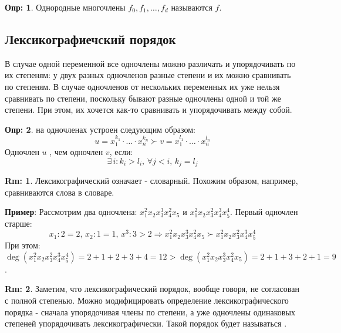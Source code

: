 \documentclass[12pt]{article}
\theoremstyle{definition}
\newtheorem{defn}{Опр:}
\newtheorem{rem}{Rm:}
\begin{document}
\begin{defn}
	Однородные многочлены $f_0,f_1,\dotsc, f_d$ называются  $f$.
\end{defn}

\subsection*{Лексикографиечский порядок}
В случае одной переменной все одночлены можно различать и упорядочивать по их степеням: у двух разных одночленов разные степени и их можно сравнивать по степеням. В случае одночленов от нескольких переменных их уже нельзя сравнивать по степени, поскольку бывают разные одночлены одной и той же степени. При этом, их хочется как-то сравнивать и упорядочивать между собой.

\begin{defn}
	 на одночленах устроен следующим образом:
	$$
		u = x_1^{k_1}{\cdot}\dotsc{\cdot}x_n^{k_n} \succ v = x_1^{l_1}{\cdot}\dotsc{\cdot}x_n^{l_n}
	$$
	Одночлен $u$ , чем одночлен $v$, если: 
	$$
		\exists \, i \colon k_i > l_i, \, \forall j < i, \, k_j = l_j
	$$
\end{defn}
\begin{rem}
	Лексикографический означает - словарный. Похожим образом, например, сравниваются слова в словаре.
\end{rem}

\textbf{Пример}: Рассмотрим два одночлена: $x_1^2x_2x_3^3x_4^2x_5$ и  $x_1^2x_2x_3^2x_4^3x_5^4$. Первый одночлен старше:
$$
	x_1 \colon 2 = 2, \, x_2 \colon 1 = 1, \, x^3 \colon 3 > 2 \Rightarrow x_1^2x_2x_3^3x_4^2x_5 \succ x_1^2x_2x_3^2x_4^3x_5^4
$$
При этом: $\deg(x_1^2x_2x_3^2x_4^3x_5^4) = 2 + 1 + 2 + 3 + 4 = 12 > \deg(x_1^2x_2x_3^3x_4^2x_5) = 2 + 1 + 3 + 2 + 1 = 9$.

\begin{rem}
	Заметим, что лексикографический порядок, вообще говоря, не согласован с полной степенью. Можно модифицировать определение лексикографического порядка - сначала упорядочивая члены по степени, а уже одночлены одинаковых степеней упорядочивать лексикографически. Такой порядок будет называться .
\end{rem}
\end{document}
